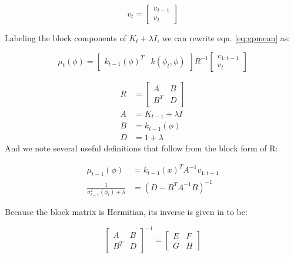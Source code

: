 \documentclass[letterpaper, 10 pt, conference]{ieeeconf}
\begin{document}
\begin{equation}
    v_t = 
    \begin{bmatrix}
        v_{t-1} \\
        v_t
    \end{bmatrix}
\end{equation}
\smallskip

Labeling the block components of $K_t+\lambda I$, we can rewrite eqn. \ref{eq:gpmean} as:

\begin{equation}
    \mu_t(\phi) =
    \begin{bmatrix}
        k_{t-1}(\phi)^T & k(\phi_t,\phi)
    \end{bmatrix}
    R^{-1}
    \begin{bmatrix}
        v_{1:t-1} \\
        v_t
    \end{bmatrix}
    \label{eq:gpmeanblock}
\end{equation}

\begin{align}
    R&=
    \begin{bmatrix}
        A & B \\
        B^T & D
    \end{bmatrix}
    \nonumber \\
    A &= K_{t-1}+\lambda I \nonumber \\
    B &= k_{t-1}(\phi) \nonumber \\
    D &= 1+\lambda \nonumber
\end{align}
\smallskip
And we note several useful definitions that follow from the block form of R:

\begin{align}
    \mu_{t-1}(\phi) &= k_{t-1}(x)^T A^{-1} v_{1:t-1} \label{eq:blockdefmu}\\ 
    \frac{1}{\sigma_{t-1}^2(\phi_t)+\lambda} &= (D-B^T A^{-1}B)^{-1} \label{eq:blockdefsig}
\end{align}
\smallskip

Because the block matrix is Hermitian, its inverse is given in \cite{lu02} to be:

\begin{equation}
    \begin{bmatrix}
        A & B \\
        B^T & D
    \end{bmatrix}^{-1}
    =
    \begin{bmatrix}
        E & F \\
        G & H
    \end{bmatrix}
    \label{eq:blockinverse}
\end{equation}
\end{document}
